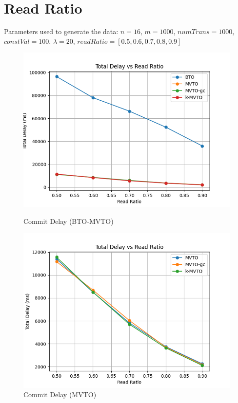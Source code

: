 \documentclass[12pt]{article}
\begin{document}
\section*{Read Ratio}
Parameters used to generate the data:
$n=16$, $m=1000$, $numTrans=1000$, $constVal=100$, $\lambda=20$, $readRatio = [0.5, 0.6, 0.7, 0.8, 0.9]$
\begin{figure}[h]
    \centering
    \begin{minipage}[b]{0.45\textwidth}
        \includegraphics[width=\textwidth]{./images/ReadRatioTD.png}
        \caption{Commit Delay (BTO-MVTO)}
        \label{fig:ReadRatioTD}
    \end{minipage}
    \hfill
    \begin{minipage}[b]{0.45\textwidth}
        \includegraphics[width=\textwidth]{./images/MVTOreadRatioTD.png}
        \caption{Commit Delay (MVTO)}
        \label{fig:MVTOreadRatioTD}
    \end{minipage}
\end{figure} \\
\end{document}
